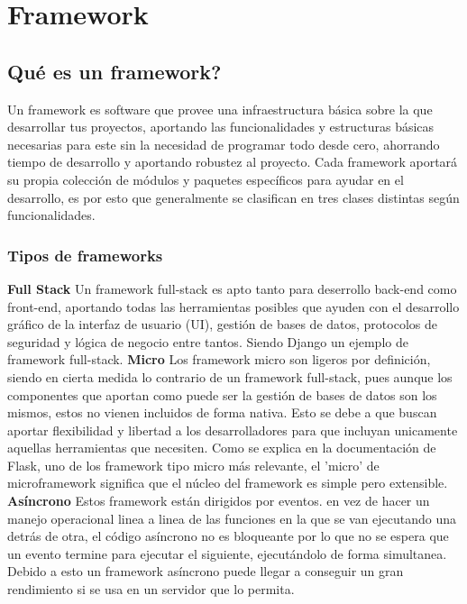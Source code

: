 \newpage

\section{Framework}

\subsection{Qué es un framework?}
Un framework es software que provee una infraestructura básica sobre la que desarrollar tus proyectos, aportando las funcionalidades y estructuras básicas necesarias para este sin la necesidad de programar todo desde cero, ahorrando tiempo de desarrollo y aportando robustez al proyecto. \cite{ghimire2020comparative}
\newline
\newline
Cada framework aportará su propia colección de módulos y paquetes específicos para ayudar en el desarrollo, es por esto que generalmente se clasifican en tres clases distintas según funcionalidades. \cite{WebFra}

\subsubsection{Tipos de frameworks}
\textbf{Full Stack}
\newline
Un framework full-stack es apto tanto para deserrollo back-end como front-end, aportando todas las herramientas posibles que ayuden con el desarrollo gráfico de la interfaz de usuario (UI), gestión de bases de datos, protocolos de seguridad y lógica de negocio entre tantos. Siendo Django un ejemplo de framework full-stack. 
\newline
\newline
\textbf{Micro}
\newline
Los framework micro son ligeros por definición, siendo en cierta medida lo contrario de un framework full-stack, pues aunque los componentes que aportan como puede ser la gestión de bases de datos son los mismos, estos no vienen incluidos de forma nativa. Esto se debe a que buscan aportar flexibilidad y libertad a los desarrolladores para que incluyan unicamente aquellas herramientas que necesiten. 
\newline
\newline
Como se explica en la documentación de Flask, uno de los framework tipo micro más relevante, el 'micro' de microframework significa que el núcleo del framework es simple pero extensible.
\newline
\newline
\textbf{Asíncrono}
\newline
Estos framework están dirigidos por eventos. en vez de hacer un manejo operacional linea a linea de las funciones en la que se van ejecutando una detrás de otra, el código asíncrono no es bloqueante por lo que no se espera que un evento termine para ejecutar el siguiente, ejecutándolo de forma simultanea. Debido a esto un framework asíncrono puede llegar a conseguir un gran rendimiento si se usa en un servidor que lo permita.

